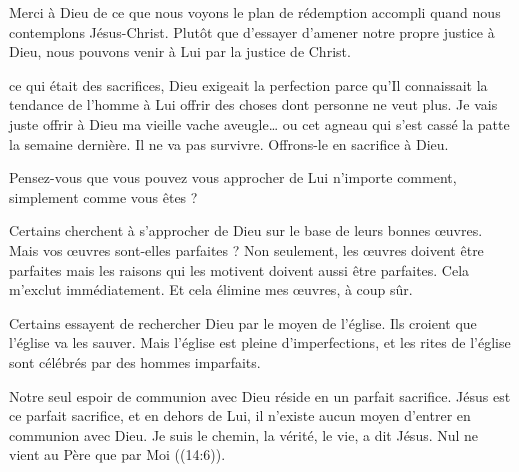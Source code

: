 
Merci à Dieu de ce que nous voyons le plan de rédemption accompli
 quand nous contemplons Jésus-Christ.
 Plutôt que d'essayer d'amener notre propre justice à Dieu,
 nous pouvons venir à Lui par la justice de Christ. 

\dvrule






 ce qui était des sacrifices,
 Dieu exigeait la perfection parce qu'Il connaissait la tendance
 de l'homme à Lui offrir des choses dont personne ne veut plus.
 \og Je vais juste offrir à Dieu ma vieille vache aveugle\dots{}
 ou cet agneau qui s'est cassé la patte la semaine dernière.
 Il ne va pas survivre. Offrons-le en sacrifice à Dieu. \fg{}


Pensez-vous que vous pouvez vous approcher de Lui n'importe comment,
 simplement comme vous êtes ? 

Certains cherchent à s'approcher de Dieu sur le base de leurs bonnes œuvres.
 Mais vos œuvres sont-elles parfaites ?
 Non seulement, les œuvres doivent être parfaites mais les raisons
 qui les motivent doivent aussi être parfaites. Cela m'exclut immédiatement.
 Et cela élimine mes œuvres, à coup sûr. 

Certains essayent de rechercher Dieu par le moyen de l'église.
 Ils croient que l'église va les sauver. Mais l'église est pleine d'imperfections,
 et les rites de l'église sont célébrés par des hommes imparfaits. 

Notre seul espoir de communion avec Dieu réside en un parfait sacrifice.
 Jésus est ce parfait sacrifice, et en dehors de Lui,
 il n'existe aucun moyen d'entrer en communion avec Dieu.
 \og Je suis le chemin, la vérité, le vie, \fg{} a dit Jésus.
 \og Nul ne vient au Père que par Moi \fg{} ((14:6)). 

